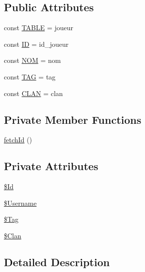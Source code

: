 \subsection*{Public Attributes}
\begin{DoxyCompactItemize}
\item 
const \hyperlink{class_hn_s_player_ab8e3041974f3ced4cbcd303b51af7491}{T\+A\+B\+LE} = \textquotesingle{}joueur\textquotesingle{}
\item 
const \hyperlink{class_hn_s_player_a79948c5c3a978cbd3f3e71325fce2109}{ID} = \textquotesingle{}id\+\_\+joueur\textquotesingle{}
\item 
const \hyperlink{class_hn_s_player_a84b544511744bdacc05d361f41a530d0}{N\+OM} = \textquotesingle{}nom\textquotesingle{}
\item 
const \hyperlink{class_hn_s_player_ab2d0bf564b744bd001dc61e64b9608c0}{T\+AG} = \textquotesingle{}tag\textquotesingle{}
\item 
const \hyperlink{class_hn_s_player_a450da07ddf379d98702f0175b867ef84}{C\+L\+AN} = \textquotesingle{}clan\textquotesingle{}
\end{DoxyCompactItemize}
\subsection*{Private Member Functions}
\begin{DoxyCompactItemize}
\item 
\hyperlink{class_hn_s_player_a2db791a389d27e0bf349916089d07294}{fetch\+Id} ()
\end{DoxyCompactItemize}
\subsection*{Private Attributes}
\begin{DoxyCompactItemize}
\item 
\hyperlink{class_hn_s_player_a3e22007d5be7f6b7f85834365843a6ff}{\$\+Id}
\item 
\hyperlink{class_hn_s_player_a4ea84ff2b23f66fc485c5ee773bb7baf}{\$\+Username}
\item 
\hyperlink{class_hn_s_player_aeeae2db5f6a811cbe86bf0f95ea20a25}{\$\+Tag}
\item 
\hyperlink{class_hn_s_player_a83ef977b007c1428147b9016f4771e38}{\$\+Clan}
\end{DoxyCompactItemize}


\subsection{Detailed Description}



